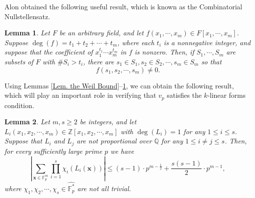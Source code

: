 \documentclass[12pt]{amsart}
\def\x{{\bm x}}
\theoremstyle{plain}
\newtheorem{lemma}{Lemma}
\theoremstyle{remark}
\begin{document}
	Alon \cite[Theorem 1.2]{A} obtained the following useful result, which is known as the Combinatorial Nullstellensatz.
	
	\begin{lemma}\label{Lem. Alon}
		Let $F$ be an arbitrary field, and let $f(x_1,\cdots,x_m)\in F[x_1,\cdots,x_m]$. Suppose $\deg(f)=t_1+t_2+\cdots+t_m$, where each $t_i$ is a nonnegative integer, and suppose that the coefficient of $x_1^{t_1}\cdots x_m^{t_m}$ in $f$ is nonzero. Then, if $S_1,\cdots,S_m$ are subsets of $F$ with $\#S_i>t_i$, there are $s_1\in S_1, s_2\in S_2,\cdots, s_m\in S_m$ so that 
		$$f(s_1,s_2,\cdots,s_m)\neq 0.$$
	\end{lemma}
	
	Using Lemmas \ref{Lem. the Weil Bound}--\ref{Lem. Alon}, we can obtain the following result, which will play an important role in verifying that $v_p$ satisfies the $k$-linear forms condition.
	
	\begin{lemma}\label{Lem. estimates for nontrival character sums}
		Let $m,s\ge2$ be integers, and let $L_i(x_1,x_2,\cdots,x_m)\in\mathbb{Z}[x_1,x_2,\cdots,x_m]$ with $\deg(L_i)=1$ for any $1\le i\le s$. Suppose  that $L_i$ and $L_j$ are not proportional over $\mathbb{Q}$ for any $1\le i\neq j\le s$. Then, for every sufficiently large prime $p$ we have 
		\begin{equation}\label{Eq. inequality in Lemma estimates for nontrival character sums}
			\left|\sum_{\x\in\mathbb{F}_p^m}\prod_{i=1}^{s}\chi_i(L_i(\x))\right|\le (s-1)\cdot p^{m-\frac{1}{2}}+\frac{s(s-1)}{2}\cdot p^{m-1},
		\end{equation}
		where $\chi_1,\chi_2,\cdots,\chi_s\in\widehat{\mathbb{F}_p^*}$ are not all trivial. 
	\end{lemma}
	
\end{document}
